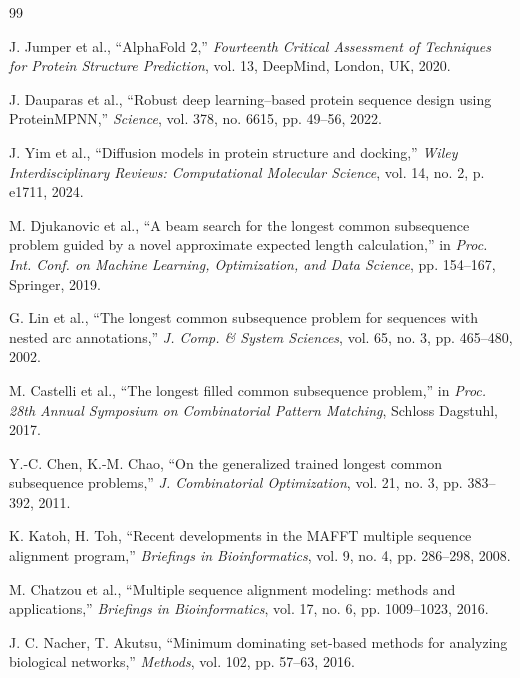 \documentclass[runningheads]{llncs}
\begin{document}
	\begin{thebibliography}{99}
		
		J. Jumper et al.,
		``AlphaFold 2,''
		\textit{Fourteenth Critical Assessment of Techniques for Protein Structure Prediction}, vol. 13, DeepMind, London, UK, 2020.
		
		J. Dauparas et al.,
		``Robust deep learning--based protein sequence design using ProteinMPNN,''
		\textit{Science}, vol. 378, no. 6615, pp. 49--56, 2022.
		
		J. Yim et al.,
		``Diffusion models in protein structure and docking,''
		\textit{Wiley Interdisciplinary Reviews: Computational Molecular Science}, vol. 14, no. 2, p. e1711, 2024.
		
		M. Djukanovic et al.,
		``A beam search for the longest common subsequence problem guided by a novel approximate expected length calculation,''
		in \textit{Proc. Int. Conf. on Machine Learning, Optimization, and Data Science}, pp. 154--167, Springer, 2019.
		
		G. Lin et al.,
		``The longest common subsequence problem for sequences with nested arc annotations,''
		\textit{J. Comp. \& System Sciences}, vol. 65, no. 3, pp. 465--480, 2002.
		
		M. Castelli et al.,
		``The longest filled common subsequence problem,''
		in \textit{Proc. 28th Annual Symposium on Combinatorial Pattern Matching}, Schloss Dagstuhl, 2017.
		
		Y.-C. Chen, K.-M. Chao,
		``On the generalized trained longest common subsequence problems,''
		\textit{J. Combinatorial Optimization}, vol. 21, no. 3, pp. 383--392, 2011.
		
		K. Katoh, H. Toh,
		``Recent developments in the MAFFT multiple sequence alignment program,''
		\textit{Briefings in Bioinformatics}, vol. 9, no. 4, pp. 286--298, 2008.
		
		M. Chatzou et al.,
		``Multiple sequence alignment modeling: methods and applications,''
		\textit{Briefings in Bioinformatics}, vol. 17, no. 6, pp. 1009--1023, 2016.
		
		J. C. Nacher, T. Akutsu,
		``Minimum dominating set-based methods for analyzing biological networks,''
		\textit{Methods}, vol. 102, pp. 57--63, 2016.
		

\end{thebibliography}
\end{document}
